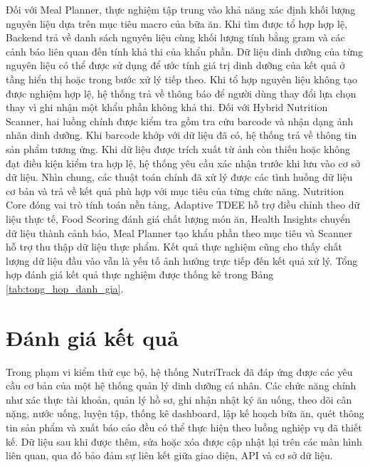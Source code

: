 \documentclass[12pt, a4paper]{report}
\begin{document}
Đối với Meal Planner, thực nghiệm tập trung vào khả năng xác định khối lượng nguyên liệu dựa trên mục tiêu macro của bữa ăn. Khi tìm được tổ hợp hợp lệ, Backend trả về danh sách nguyên liệu cùng khối lượng tính bằng gram và các cảnh báo liên quan đến tính khả thi của khẩu phần. Dữ liệu dinh dưỡng của từng nguyên liệu có thể được sử dụng để ước tính giá trị dinh dưỡng của kết quả ở tầng hiển thị hoặc trong bước xử lý tiếp theo. Khi tổ hợp nguyên liệu không tạo được nghiệm hợp lệ, hệ thống trả về thông báo để người dùng thay đổi lựa chọn thay vì ghi nhận một khẩu phần không khả thi. Đối với Hybrid Nutrition Scanner, hai luồng chính được kiểm tra gồm tra cứu barcode và nhận dạng ảnh nhãn dinh dưỡng. Khi barcode khớp với dữ liệu đã có, hệ thống trả về thông tin sản phẩm tương ứng. Khi dữ liệu được trích xuất từ ảnh còn thiếu hoặc không đạt điều kiện kiểm tra hợp lệ, hệ thống yêu cầu xác nhận trước khi lưu vào cơ sở dữ liệu.
Nhìn chung, các thuật toán chính đã xử lý được các tình huống dữ liệu cơ bản và trả về kết quả phù hợp với mục tiêu của từng chức năng. Nutrition Core đóng vai trò tính toán nền tảng, Adaptive TDEE hỗ trợ điều chỉnh theo dữ liệu thực tế, Food Scoring đánh giá chất lượng món ăn, Health Insights chuyển dữ liệu thành cảnh báo, Meal Planner tạo khẩu phần theo mục tiêu và Scanner hỗ trợ thu thập dữ liệu thực phẩm. Kết quả thực nghiệm cũng cho thấy chất lượng dữ liệu đầu vào vẫn là yếu tố ảnh hưởng trực tiếp đến kết quả xử lý. Tổng hợp đánh giá kết quả thực nghiệm được thống kê trong Bảng \ref{tab:tong_hop_danh_gia}.

\section{Đánh giá kết quả}Trong phạm vi kiểm thử cục bộ, hệ thống NutriTrack đã đáp ứng được các yêu cầu cơ bản của một hệ thống quản lý dinh dưỡng cá nhân. Các chức năng chính như xác thực tài khoản, quản lý hồ sơ, ghi nhận nhật ký ăn uống, theo dõi cân nặng, nước uống, luyện tập, thống kê dashboard, lập kế hoạch bữa ăn, quét thông tin sản phẩm và xuất báo cáo đều có thể thực hiện theo luồng nghiệp vụ đã thiết kế. Dữ liệu sau khi được thêm, sửa hoặc xóa được cập nhật lại trên các màn hình liên quan, qua đó bảo đảm sự liên kết giữa giao diện, API và cơ sở dữ liệu.
\end{document}
